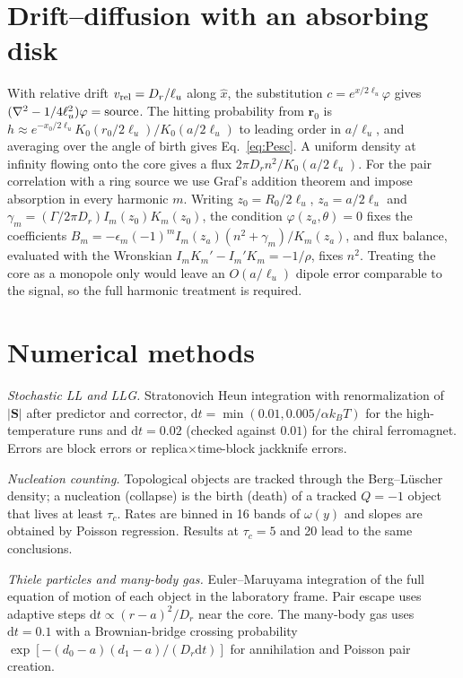 \documentclass[aps,prb,twocolumn,superscriptaddress,longbibliography,floatfix]{revtex4-2}
\newcommand{\vS}{\mathbf S}
\newcommand{\vr}{\mathbf r}
\newcommand{\kT}{k_BT}
\newcommand{\dd}{\mathrm d}
\begin{document}
\section{Drift--diffusion with an absorbing disk}\label{app:pair}

With relative drift $v_{\rm rel}=D_r/\ell_u$ along $\hat x$, the substitution $c=e^{x/2\ell_u}\varphi$ gives $(\nabla^2-1/4\ell_u^2)\varphi={\rm source}$. The hitting probability from $\vr_0$ is $h\approx e^{-x_0/2\ell_u}K_0(r_0/2\ell_u)/K_0(a/2\ell_u)$ to leading order in $a/\ell_u$, and averaging over the angle of birth gives Eq.~\eqref{eq:Pesc}. A uniform density at infinity flowing onto the core gives a flux $2\pi D_rn^2/K_0(a/2\ell_u)$. For the pair correlation with a ring source we use Graf's addition theorem and impose absorption in every harmonic $m$. Writing $z_0=R_0/2\ell_u$, $z_a=a/2\ell_u$ and $\gamma_m=(\Gamma/2\pi D_r)I_m(z_0)K_m(z_0)$, the condition $\varphi(z_a,\theta)=0$ fixes the coefficients $B_m=-\epsilon_m(-1)^mI_m(z_a)(n^2+\gamma_m)/K_m(z_a)$, and flux balance, evaluated with the Wronskian $I_mK_m'-I_m'K_m=-1/\rho$, fixes $n^2$. Treating the core as a monopole only would leave an $O(a/\ell_u)$ dipole error comparable to the signal, so the full harmonic treatment is required.

\section{Numerical methods}\label{app:numerics}

\emph{Stochastic LL and LLG.} Stratonovich Heun integration with renormalization of $|\vS|$ after predictor and corrector, $\dd t=\min(0.01,0.005/\alpha\kT)$ for the high-temperature runs and $\dd t=0.02$ (checked against $0.01$) for the chiral ferromagnet. Errors are block errors or replica$\times$time-block jackknife errors.

\emph{Nucleation counting.} Topological objects are tracked through the Berg--L\"uscher density; a nucleation (collapse) is the birth (death) of a tracked $Q=-1$ object that lives at least $\tau_c$. Rates are binned in 16 bands of $\omega(y)$ and slopes are obtained by Poisson regression. Results at $\tau_c=5$ and 20 lead to the same conclusions.

\emph{Thiele particles and many-body gas.} Euler--Maruyama integration of the full equation of motion of each object in the laboratory frame. Pair escape uses adaptive steps $\dd t\propto(r-a)^2/D_r$ near the core. The many-body gas uses $\dd t=0.1$ with a Brownian-bridge crossing probability $\exp[-(d_0-a)(d_1-a)/(D_r\dd t)]$ for annihilation and Poisson pair creation.
\end{document}
